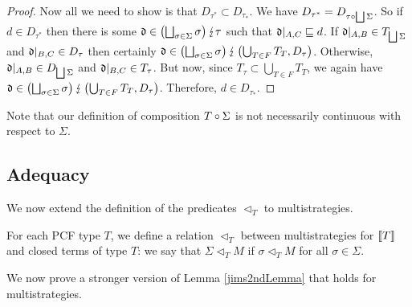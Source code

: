 \documentclass{entcs} \usepackage{prentcsmacro}
\newcommand{\exlub}{\bigsqcup}
\newcommand{\dv}{{\lightning}}
\newcommand{\0}{{\mathtt{0}}}
\newcommand{\plot}{\triangleleft}
\newcommand{\Tau}{T}
\begin{document}
\begin{proof}
  Now all we need to show is that $D_{\tau^*}\subset D_{\tau_*}$.  We have $D_{\tau^*}=D_{\icomp{\tau}{\exlub\Sigma}}$.  So if $d\in D_{\tau^*}$ then there is some $\d\in\left(\exlub_{\sigma\in\Sigma}\sigma\right)\dv\tau$ such that $\mathfrak d\vert_{A,C}\sqsubseteq d$.  If $\d\vert_{A,B}\in T_{\exlub \Sigma}$ and $\mathfrak d\vert_{B,C}\in D_\tau$ then certainly $\d\in \left(\exlub_{\sigma\in\Sigma}\sigma\right)\dv\left(\bigcup_{\Tau\in F}T_\Tau,D_\tau\right)$.  Otherwise, $\d\vert_{A,B}\in D_{\exlub \Sigma}$ and $\mathfrak d\vert_{B,C}\in T_\tau$.  But now, since $T_\tau\subset \bigcup_{\Tau\in F}T_\Tau$, we again have $\d\in \left(\exlub_{\sigma\in\Sigma}\sigma\right)\dv\left(\bigcup_{\Tau\in F}T_\Tau,D_\tau\right)$.  Therefore, $d\in D_{\tau_*}$.  
\end{proof}

Note that our definition of composition $\icomp\Tau\Sigma$ is not necessarily continuous with respect to $\Sigma$.  

\subsection{Adequacy}

We now extend the definition of the predicates $\plot_T$ to multistrategies.  

\begin{definition}
  For each PCF type $T$, we define a relation $\plot_T$ between multistrategies for $\left\llbracket T\right\rrbracket$ and closed terms of type $T$: we say that $\Sigma\plot_TM$ if $\sigma\plot_TM$ for all $\sigma\in\Sigma$.  
\end{definition}

We now prove a stronger version of Lemma \ref{jims2ndLemma} that holds for multistrategies.  
\end{document}
